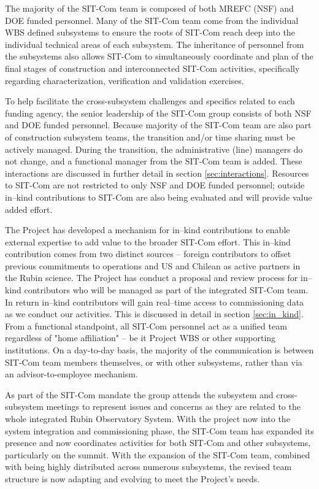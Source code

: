 \documentclass[SE,lsstdraft,authoryear,toc]{lsstdoc}
\begin{document}
The majority of the SIT-Com team is composed of both MREFC (NSF) and DOE funded personnel.  Many of the SIT-Com team come from the individual WBS defined subsystems to ensure the roots of SIT-Com reach deep into the individual technical areas of each subsystem.   The inheritance of personnel from the subsystems also allows SIT-Com to simultaneously coordinate and plan of the final stages of construction and interconnected SIT-Com activities, specifically regarding characterization, verification and validation exercises.

To help facilitate the cross-subsystem challenges and specifics related to each funding agency, the senior leadership of the SIT-Com group consists of both NSF and DOE funded personnel.  Because majority of the SIT-Com team are also part of construction subsystem teams, the transition and/or time sharing must be actively managed.  During the transition, the administrative (line) managers do not change, and a functional manager from the SIT-Com team is added.
These interactions are discussed in further detail in section \ref{sec:interactions}.  Resources to SIT-Com are not restricted to only NSF and DOE funded personnel; outside in--kind contributions to SIT-Com are also being evaluated and will provide value added effort.

 The Project has developed a mechanism for in--kind contributions to enable external expertise to add value to the broader SIT-Com effort.  This in--kind contribution comes from two distinct sources -- foreign contributors to offset previous commitments to operations and US and Chilean as active partners in the Rubin science.  The Project has conduct a proposal and review process for in--kind contributors who will be managed as part of the integrated SIT-Com team.  In return in--kind contributors will gain real--time access to commissioning data as we conduct our activities.  This is discussed in detail in section \ref{sec:in_kind}.  From a functional standpoint, all SIT-Com personnel act as a unified team regardless of "home affiliation" -- be it Project WBS or other supporting institutions.  On a day-to-day basis, the majority of the communication is between SIT-Com team members themselves, or with other subsystems, rather than via an advisor-to-employee mechanism.

As part of the SIT-Com mandate the group attends the subsystem and cross-subsystem meetings to represent issues and concerns as they are related to the whole integrated Rubin Observatory System.  With the project now into the system integration and commissioning phase, the SIT-Com team has expanded its presence and now coordinates activities for both SIT-Com and other subsystems, particularly on the summit.  With the expansion of the SIT-Com team, combined with being highly distributed across numerous subsystems, the revised team structure is now adapting and evolving to meet the Project's needs.
\end{document}
